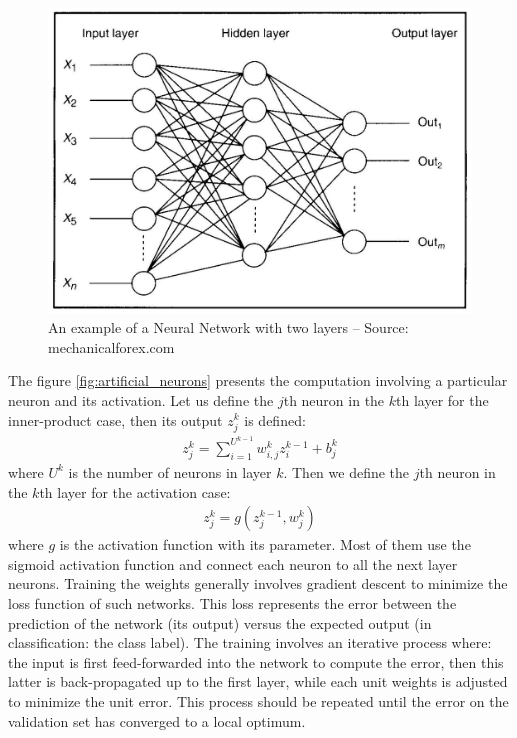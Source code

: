\documentclass[a4paper,12pt]{report}
\begin{document}
\begin{figure}[t]
    \begin{center}
        \includegraphics{thesis_figures/NN.jpg}
    \end{center}
    \caption{An example of a Neural Network with two layers -- Source: mechanicalforex.com}
    \label{fig:neural_network}
\end{figure}

The figure \ref{fig:artificial_neurons} presents the computation involving a particular neuron and its activation.
Let us define the $j$th neuron in the $k$th layer for the inner-product case, then its output $z^k_j$ is defined:
\begin{eqnarray}
    z^k_j = \sum_{i=1}^{U^{k-1}} w^k_{i,j} z^{k-1}_i + b^k_j
\end{eqnarray}
where $U^k$ is the number of neurons in layer $k$.
Then we define the $j$th neuron in the $k$th layer for the activation case:
\begin{eqnarray}
    z^k_j = g(z^{k-1}_j, w^k_{j})
\end{eqnarray}
where $g$ is the activation function with its parameter.
Most of them use the sigmoid activation function and connect each neuron to all the next layer neurons.
Training the weights generally involves gradient descent to minimize the loss function of such networks.
This loss represents the error between the prediction of the network (its output) versus the expected output (in classification: the class label).
The training involves an iterative process where: the input is first feed-forwarded into the network to compute the error, then this latter is back-propagated up to the first layer, while each unit weights is adjusted to minimize the unit error.
This process should be repeated until the error on the validation set has converged to a local optimum.
\end{document}

